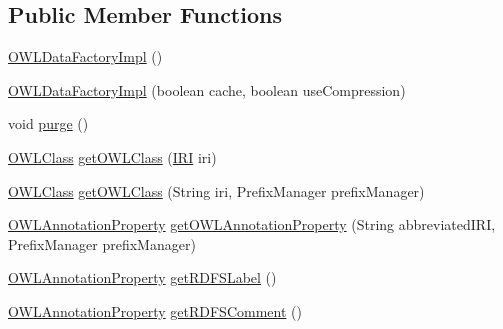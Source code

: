 \subsection*{Public Member Functions}
\begin{DoxyCompactItemize}
\item 
\hyperlink{classuk_1_1ac_1_1manchester_1_1cs_1_1owl_1_1owlapi_1_1_o_w_l_data_factory_impl_a88d4661f171fcc1056ccfa6d5050c4bc}{O\-W\-L\-Data\-Factory\-Impl} ()
\item 
\hyperlink{classuk_1_1ac_1_1manchester_1_1cs_1_1owl_1_1owlapi_1_1_o_w_l_data_factory_impl_a4ab0d5ab5a71ca0fbb6872e5de001611}{O\-W\-L\-Data\-Factory\-Impl} (boolean cache, boolean use\-Compression)
\item 
void \hyperlink{classuk_1_1ac_1_1manchester_1_1cs_1_1owl_1_1owlapi_1_1_o_w_l_data_factory_impl_afdbcdb465aa2200ac8d0e28e641937a3}{purge} ()
\item 
\hyperlink{interfaceorg_1_1semanticweb_1_1owlapi_1_1model_1_1_o_w_l_class}{O\-W\-L\-Class} \hyperlink{classuk_1_1ac_1_1manchester_1_1cs_1_1owl_1_1owlapi_1_1_o_w_l_data_factory_impl_a3f7141b904b78da1c678a0699d23698c}{get\-O\-W\-L\-Class} (\hyperlink{classorg_1_1semanticweb_1_1owlapi_1_1model_1_1_i_r_i}{I\-R\-I} iri)
\item 
\hyperlink{interfaceorg_1_1semanticweb_1_1owlapi_1_1model_1_1_o_w_l_class}{O\-W\-L\-Class} \hyperlink{classuk_1_1ac_1_1manchester_1_1cs_1_1owl_1_1owlapi_1_1_o_w_l_data_factory_impl_ab8aa240cca9067073edf7383f657d3d2}{get\-O\-W\-L\-Class} (String iri, Prefix\-Manager prefix\-Manager)
\item 
\hyperlink{interfaceorg_1_1semanticweb_1_1owlapi_1_1model_1_1_o_w_l_annotation_property}{O\-W\-L\-Annotation\-Property} \hyperlink{classuk_1_1ac_1_1manchester_1_1cs_1_1owl_1_1owlapi_1_1_o_w_l_data_factory_impl_a6805beb4f2857c7522684892087f2562}{get\-O\-W\-L\-Annotation\-Property} (String abbreviated\-I\-R\-I, Prefix\-Manager prefix\-Manager)
\item 
\hyperlink{interfaceorg_1_1semanticweb_1_1owlapi_1_1model_1_1_o_w_l_annotation_property}{O\-W\-L\-Annotation\-Property} \hyperlink{classuk_1_1ac_1_1manchester_1_1cs_1_1owl_1_1owlapi_1_1_o_w_l_data_factory_impl_a6124c7159ba113050b44a563170bde24}{get\-R\-D\-F\-S\-Label} ()
\item 
\hyperlink{interfaceorg_1_1semanticweb_1_1owlapi_1_1model_1_1_o_w_l_annotation_property}{O\-W\-L\-Annotation\-Property} \hyperlink{classuk_1_1ac_1_1manchester_1_1cs_1_1owl_1_1owlapi_1_1_o_w_l_data_factory_impl_a3e2879556be63b6ccc2c3c198f33e5ee}{get\-R\-D\-F\-S\-Comment} ()

\end{DoxyCompactItemize}
